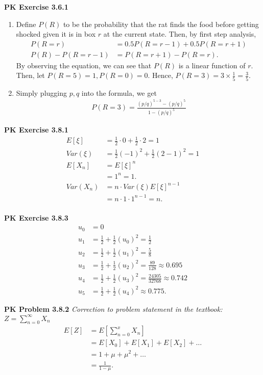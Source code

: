 \documentclass{article}
\begin{document}
\textbf{PK Exercise 3.6.1}
\begin{enumerate}[label=(\alph*)]
    \item 
    Define $P(R)$ to be the probability that the rat finds the food before getting shocked given it is in box $r$ at the current state.
    Then, by first step analysis, 
    \begin{align*}
        P(R=r) & = 0.5P(R=r-1) + 0.5P(R=r+1) \\ 
        P(R) - P(R=r-1) & = P(R=r+1) - P(R=r).
    \end{align*}
    By observing the equation, we can see that $P(R)$ is a linear function of $r$. 
    Then, let $P(R=5) = 1, P(R=0) = 0$. Hence, $P(R=3) = 3\times \frac{1}{5} = \frac{3}{5}$.

    \item
    Simply plugging $p, q$ into the formula, we get 
    \begin{align*}
        P(R=3) = \frac{(p/q)^{5-3}-(p/q)^5}{1-(p/q)^5}
    \end{align*}
\end{enumerate}
\bigbreak

\textbf{PK Exercise 3.8.1}
\begin{align*}
    E[\xi] & = \frac{1}{2}\cdot 0 + \frac{1}{2}\cdot 2 = 1 \\
    Var(\xi) & = \frac{1}{2}(-1)^2 + \frac{1}{2}(2-1)^2 = 1 \\
    E[X_n] & = E[\xi]^n \\
    & = 1^n = 1.\\
    Var(X_n) & = n\cdot Var(\xi)E[\xi]^{n-1} \\
    & = n\cdot 1\cdot 1^{n-1} = n. \\
\end{align*}
\bigbreak

\textbf{PK Exercise 3.8.3}
\begin{align*}
    u_0 & = 0 \\
    u_1 & = \frac{1}{2} + \frac{1}{2}(u_0)^2 = \frac{1}{2} \\
    u_2 & = \frac{1}{2} + \frac{1}{2}(u_1)^2 = \frac{5}{8} \\
    u_3 & = \frac{1}{2} + \frac{1}{2}(u_2)^2 = \frac{89}{128} \approx 0.695 \\
    u_4 & = \frac{1}{2} + \frac{1}{2}(u_3)^2 = \frac{24305}{32768} \approx 0.742 \\
    u_5 & = \frac{1}{2} + \frac{1}{2}(u_4)^2 \approx 0.775.
\end{align*}
\bigbreak

\textbf{PK Problem 3.8.2} \emph{Correction to problem statement in the textbook: $Z = \sum\limits_{n=0}^{\infty}X_n$}
\begin{align*}
    E[Z] & = E\left[\sum_{n=0}^{x}X_n\right] \\
    & = E[X_0] + E[X_1] + E[X_2] + \dots \\
    & = 1 + \mu + \mu^2 + \dots \\
    & = \frac{1}{1-\mu}. 
\end{align*}
\end{document}
